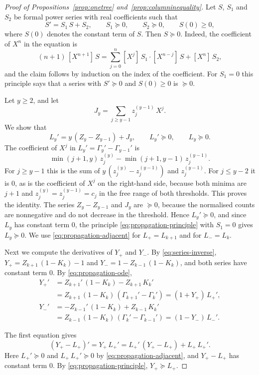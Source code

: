 \documentclass{amsart}
\theoremstyle{definition}
\theoremstyle{remark}
\numberwithin{equation}{section}
\begin{document}
\begin{proof}[Proof of Propositions~\ref{prop:onetree} and~\ref{prop:columninequality}]
Let $S$, $S_1$ and $S_2$ be formal power series with real coefficients such
that
\begin{equation}\label{eq:propagation-principle}
S'=S_1\,S+S_2,\qquad S_1\succeq0,\qquad S_2\succeq0,\qquad S(0)\ge0,
\end{equation}
where $S(0)$ denotes the constant term of $S$. Then $S\succeq0$. Indeed, the
coefficient of $X^n$ in the equation is
\[
(n+1)\,[X^{n+1}]\,S=\sum_{j=0}^{n}[X^j]\,S_1\cdot[X^{n-j}]\,S+[X^n]\,S_2 ,
\]
and the claim follows by induction on the index of the coefficient. For
$S_1=0$ this principle says that a series with $S'\succeq0$ and $S(0)\ge0$ is
$\succeq0$.

Let $y\ge2$, and let
\[
J_y=\sum_{j\ge y-1}z^{(y-1)}_j\,X^j .
\]
We show that
\begin{equation}\label{eq:propagation-adjacent}
L_y'=y\,(Z_y-Z_{y-1})+J_y,\qquad L_y'\succeq0,\qquad L_y\succeq0 .
\end{equation}
The coefficient of $X^j$ in $L_y'=\Gamma_y'-\Gamma_{y-1}'$ is
\[
\min(j+1,y)\,z^{(y)}_j-\min(j+1,y-1)\,z^{(y-1)}_j .
\]
For $j\ge y-1$ this is the sum of $y\,(z^{(y)}_j-z^{(y-1)}_j)$ and
$z^{(y-1)}_j$. For $j\le y-2$ it is $0$, as is the coefficient of $X^j$ on
the right-hand side, because both minima are $j+1$ and
$z^{(y)}_j=z^{(y-1)}_j=c_j$ in the free range of both thresholds. This
proves the identity. The series $Z_y-Z_{y-1}$ and $J_y$ are $\succeq0$,
because the normalised counts are nonnegative and do not decrease in the
threshold. Hence $L_y'\succeq0$, and since $L_y$ has constant term $0$,
the principle \eqref{eq:propagation-principle} with $S_1=0$ gives
$L_y\succeq0$. We use \eqref{eq:propagation-adjacent} for $L_+=L_{k+1}$ and
for $L_-=L_k$.

Next we compute the derivatives of $Y_+$ and $Y_-$. By
\eqref{eq:series-inverse}, $Y_+=Z_{k+1}\,(1-K_k)-1$ and
$Y_-=1-Z_{k-1}\,(1-K_k)$, and both series have constant term $0$. By
\eqref{eq:propagation-ode},
\begin{align*}
Y_+'&=Z_{k+1}'\,(1-K_k)-Z_{k+1}\,K_k'\\
&=Z_{k+1}\,(1-K_k)\,(\Gamma_{k+1}'-\Gamma_k')=(1+Y_+)\,L_+',\\
Y_-'&=-Z_{k-1}'\,(1-K_k)+Z_{k-1}\,K_k'\\
&=Z_{k-1}\,(1-K_k)\,(\Gamma_k'-\Gamma_{k-1}')=(1-Y_-)\,L_-'.
\end{align*}

The first equation gives
\[
(Y_+-L_+)'=Y_+\,L_+'=L_+'\,(Y_+-L_+)+L_+\,L_+' .
\]
Here $L_+'\succeq0$ and $L_+\,L_+'\succeq0$ by
\eqref{eq:propagation-adjacent}, and $Y_+-L_+$ has constant term $0$. By
\eqref{eq:propagation-principle}, $Y_+\succeq L_+$.


\end{proof}
\end{document}
